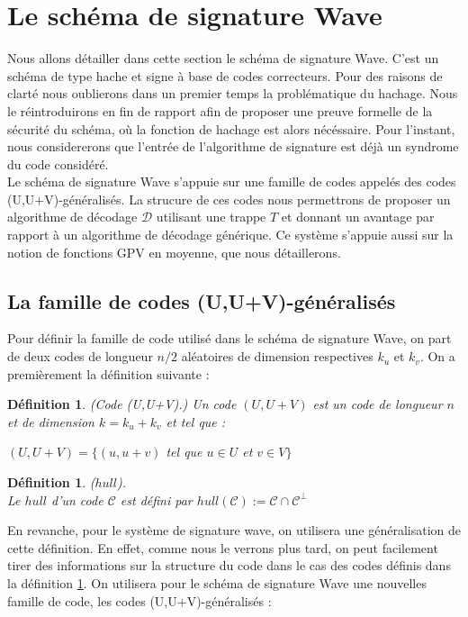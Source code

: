 \documentclass[12pt]{article}
\theoremstyle{plain}
\newtheorem{defi}[thm]{Définition}
\begin{document}
\section{Le schéma de signature Wave}
Nous allons détailler dans cette section le schéma de signature Wave. C'est un schéma de type hache et signe à base de codes correcteurs. Pour des raisons de clarté nous oublierons dans un premier temps la problématique du hachage. Nous le réintroduirons en fin de rapport afin de proposer une preuve formelle de la sécurité du schéma, où la fonction de hachage est alors nécéssaire. Pour l'instant, nous considererons que l'entrée de l'algorithme de signature est déjà un syndrome du code considéré.\\
Le schéma de signature Wave s'appuie sur une famille de codes appelés des codes (U,U+V)-généralisés. La strucure de ces codes nous permettrons de proposer un algorithme de décodage $\mathcal{D}$ utilisant une trappe $T$ et donnant un avantage par rapport à un algorithme de décodage générique. Ce système s'appuie aussi sur la notion de fonctions GPV en moyenne, que nous détaillerons.

\subsection{La famille de codes (U,U+V)-généralisés}
Pour définir la famille de code utilisé dans le schéma de signature Wave, on part de deux codes de longueur $n/2$ aléatoires de dimension respectives $k_u$ et $k_v$. On a premièrement la définition suivante :

\begin{defi}\label{UV} (Code (U,U+V).) Un code $(U,U+V)$ est un code de longueur $n$ et de dimension $k=k_u+k_v$ et tel que :
\begin{center}
$(U,U+V) = \{(u,u+v)$ tel que $u \in U$ et $v \in V \}$
\end{center}
\end{defi}


\begin{defi}($hull$).\\
Le  $hull$ d'un code $\mathcal{C}$ est défini par $hull(\mathcal{C}) := \mathcal{C} \cap \mathcal{C}^{\bot}$
\end{defi}


En revanche, pour le système de signature wave, on utilisera une généralisation de cette définition. En effet, comme nous le verrons plus tard, on peut facilement tirer des informations sur la structure du code dans le cas des codes définis dans la définition \ref{UV}. On utilisera pour le schéma de signature Wave une nouvelles famille de code, les codes (U,U+V)-généralisés :\\
\end{document}
